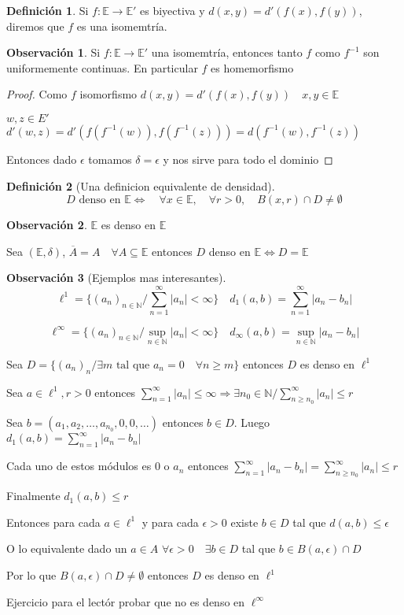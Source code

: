 \documentclass[12pt]{article}
\newcommand{\E}{\mathbb{E}}
\newcommand{\N}{\mathbb{N}}
\newcommand{\Ra}{\Rightarrow}
\newcommand{\ra}{\rightarrow}
\newcommand{\ol}{\overline}
\theoremstyle{definition}
\newtheorem{definition}{Definición}[section]
\newtheorem*{remark}{Observación}
\begin{document}
\begin{definition}
  Si $f: \E \ra \E '$ es biyectiva y $d(x,y) = d'(f(x),f(y))$, diremos que $f$ es una isomemtría. 
\end{definition}
\begin{remark}
  Si $f : \E \ra \E '$ una isomemtría, entonces tanto $f$ como $f^{-1}$ son uniformemente continuas. En particular $f$ es homemorfismo
  \begin{proof}
    Como $f$ isomorfismo $d(x,y) = d'(f(x),f(y)) \quad x,y \in \E$

    $w,z \in E ' \quad $ $d'(w,z) = d'(f(f^{-1}(w)),f(f^{-1}(z))) = d(f^{-1}(w), f^{-1}(z))$ 
  
Entonces dado $\epsilon$ tomamos $\delta = \epsilon$ y nos sirve para todo el dominio
  \end{proof}
\end{remark}
\begin{definition}[Una definicion equivalente de densidad]

  $$ D \text{ denso en } \E \iff \quad \forall x \in \E, \quad \forall r>0 ,\quad  B(x,r) \cap D \neq \emptyset$$ 
\end{definition}
\begin{remark}
  $\E$ es denso en $\E$

  Sea $(\E,\delta)$, $\ol A = A \quad \forall A \subseteq \E$ entonces $D$ denso en $\E \iff D = \E$ 
\end{remark}
\begin{remark}[Ejemplos mas interesantes]
  $$\ell^1 = \{(a_n)_{n \in \N} / \sum_{n=1}^{\infty}|a_n| < \infty\} \quad d_1(a,b) = \sum_{n = 1}^{\infty}|a_n - b_n|$$

  $$\ell^{\infty} = \{(a_n)_{n \in \N} / \sup_{n \in \N}|a_n| < \infty\} \quad d_{\infty}(a,b) = \sup_{n \in \N} |a_n - b_n|$$

  Sea $D = \{(a_n)_n / \exists m \text{ tal que } a_n = 0 \quad \forall n \geq m\}$ entonces $D$ es denso en $\ell^1$

Sea $a \in \ell^1 , r>0$ entonces $\sum_{n=1}^{\infty}|a_n| \leq \infty \Ra \exists n_0 \in \N  / \sum_{n \geq n_0}^{\infty} |a_n| \leq r$

Sea $b = (a_1,a_2, \dots , a_{n_0},0,0, \dots)$ entonces $b \in D$. Luego $d_1(a,b) = \sum_{n=1}^{\infty} |a_n - b_n|$ 

Cada uno de estos módulos es 0 o $a_n$ entonces $\sum_{n=1}^{\infty} |a_n - b_n|=   \sum_{n\geq n_0}^{\infty} |a_n| \leq r$

Finalmente $d_1(a,b) \leq r$

Entonces para cada $a \in \ell^1$ y para cada $\epsilon > 0$ existe $b \in D$ tal que $d(a,b) \leq \epsilon$

O lo equivalente dado un $a \in A$ $\forall \epsilon >0 \quad \exists b\in D$ tal que  $ b \in B(a,\epsilon) \cap D$ 

Por lo que $B(a,\epsilon) \cap D \neq \emptyset$ entonces $D$ es denso en $\ell^1$

Ejercicio para el lectór probar que no es denso en $\ell^{\infty}$
\end{remark}
\end{document}
